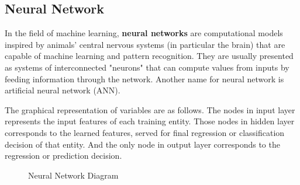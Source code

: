 \documentclass{article} %
\begin{document}
\subsection{Neural Network}
In the field of machine learning, {\bf neural networks} are computational models
inspired by animals' central nervous systems (in particular the brain) that
are capable of machine learning and pattern recognition. They are usually
presented as systems of interconnected "neurons" that can compute values from
inputs by feeding information through the network. Another name for neural
network is artificial neural network (ANN).

The graphical representation of variables are as follows. The nodes in input
layer represents the input features of each training entity. Those nodes in
hidden layer corresponds to the learned features, served for final regression
or classification decision of that entity. And the only node in output layer
corresponds to the regression or prediction decision.

\def\layersep{2.5cm}
\begin{figure}[h]
\begin{center}
\end{center}
\caption{Neural Network Diagram}
\end{figure}
\end{document}
